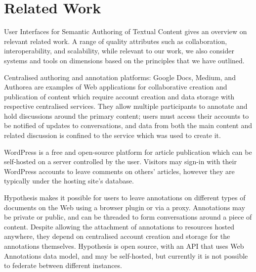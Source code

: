 \documentclass[a4paper]{llncs}
\begin{document}
                        
                    

                    
                        \section{Related Work}
  \label{related-work}

                        
                            
\par \empty User Interfaces for Semantic Authoring of Textual Content gives an overview on relevant related work. A range of quality attributes such as collaboration, interoperability, and scalability, while relevant to our work, we also consider systems and tools on dimensions based on the principles that we have outlined.

                            
\par 
                                Centralised authoring and annotation platforms:
                                \empty Google Docs, \empty Medium, and \empty Authorea are examples of Web applications for collaborative creation and publication of content which require account creation and data storage with respective centralised services. They allow multiple participants to annotate and hold discussions around the primary content; users must access their accounts to be notified of updates to conversations, and data from both the main content and related discussion is confined to the service which was used to create it.

                                \empty WordPress is a free and open-source platform for article publication which can be self-hosted on a server controlled by the user. Visitors may sign-in with their WordPress accounts to leave comments on others’ articles, however they are typically under the hosting site’s database.

                                \empty Hypothesis makes it possible for users to leave annotations on different types of documents on the Web using a browser plugin or via a proxy. Annotations may be private or public, and can be threaded to form conversations around a piece of content. Despite allowing the attachment of annotations to resources hosted anywhere, they depend on centralised account creation and storage for the annotations themselves. Hypothesis is open source, with an API that uses Web Annotations data model, and may be self-hosted, but currently it is not possible to federate between different instances.
\end{document}
